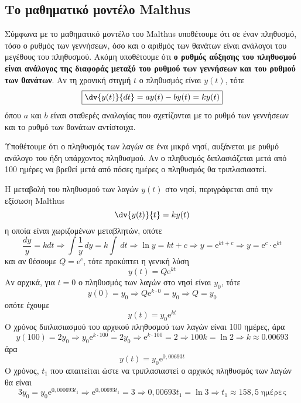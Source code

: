 \subsection*{Το μαθηματικό μοντέλο Malthus}


Σύμφωνα με το μαθηματικό μοντέλο του Malthus υποθέτουμε ότι σε έναν πληθυσμό, τόσο ο 
ρυθμός των γεννήσεων, όσο και ο αριθμός των θανάτων είναι ανάλογοι του μεγέθους του 
πληθυσμού. Ακόμη υποθέτουμε ότι \textbf{ο ρυθμός αύξησης του πληθυσμού είναι ανάλογος 
της διαφοράς μεταξύ του ρυθμού των γεννήσεων και του ρυθμού των θανάτων}. 
Αν τη χρονική στιγμή $t$ ο πληθυσμός είναι $ y(t) $, τότε 
\[
  \boxed{  \dv{y(t)}{dt} = ay(t)-by(t) = ky(t) }
\] 
όπου $a$ και $b$ είναι σταθερές αναλογίας που σχετίζονται με το ρυθμό των γεννήσεων και 
το ρυθμό των θανάτων αντίστοιχα.


\begin{problem}
  Υποθέτουμε ότι ο πληθυσμός των λαγών σε ένα μικρό νησί, αυξάνεται με ρυθμό ανάλογο 
  του ήδη υπάρχοντος πληθυσμού. Αν ο πληθυσμός διπλασιάζεται μετά από 100 ημέρες να
  βρεθεί μετά από πόσες ημέρες ο πληθυσμός θα τριπλασιαστεί.
\end{problem}
\begin{solution}
  Η μεταβολή του πληθυσμού των λαγών $ y(t) $ στο νησί, περιγράφεται από την 
  εξίσωση Malthus 
  \[
    \dv{y(t)}{t} = ky(t) 
  \]
  η οποία είναι χωριζομένων μεταβλητών, οπότε
  \[
    \frac{dy}{y} = k dt \Rightarrow \int \frac{1}{y} \,{dy} = k \int \,{dt} \Rightarrow
    \ln{y} = k t + c \Rightarrow y = \mathrm{e}^{kt+c} \Rightarrow y = \mathrm{e}^{c} 
    \cdot \mathrm{e}^{kt}  
  \] 
  και αν θέσουμε $ Q = \mathrm{e}^{c} $, τότε προκύπτει η γενική λύση 
  \[
    y(t) = Q \mathrm{e}^{kt} 
  \]
  Αν αρχικά, για $ t=0 $ ο πληθυσμός των λαγών στο νησί είναι $ y_{0} $, τότε 
  \[
    y(0)= y_{0} \Rightarrow Q \mathrm{e}^{k \cdot 0} = y_{0} \Rightarrow Q = y_{0} 
  \] 
  οπότε έχουμε
  \[
    y(t) = y_{0} \mathrm{e}^{kt} 
  \] 
  Ο χρόνος διπλασιασμού του αρχικού πληθυσμού των λαγών είναι 100 ημέρες, άρα 
  \[
    y(100) = 2 y_{0} \Rightarrow y_{0} \mathrm{e}^{k \cdot 100} = 2 y_{0} \Rightarrow 
    \mathrm{e}^{k \cdot 100} = 2 \Rightarrow 100 k = \ln{2} \Rightarrow k 
    \approx 0.00693 
  \] 
  άρα 
  \[
    y(t) = y_{0} \mathrm{e}^{0,00693t}  
  \] 
  Ο χρόνος, $ t_{1} $ που απαιτείται ώστε να τριπλασιαστεί ο αρχικός πληθυσμός 
  των λαγών θα είναι
  \[
    3 y_{0} = y_{0} \mathrm{e}^{0,000693 t_{1}} \Rightarrow  \mathrm{e}^{0,00693 t_{1}}
    = 3 \Rightarrow 0,00693 t_{1} = \ln{3} \Rightarrow t_{1} \approx 158,5 \;
    \text{ημέρες}
  \] 
\end{solution}

